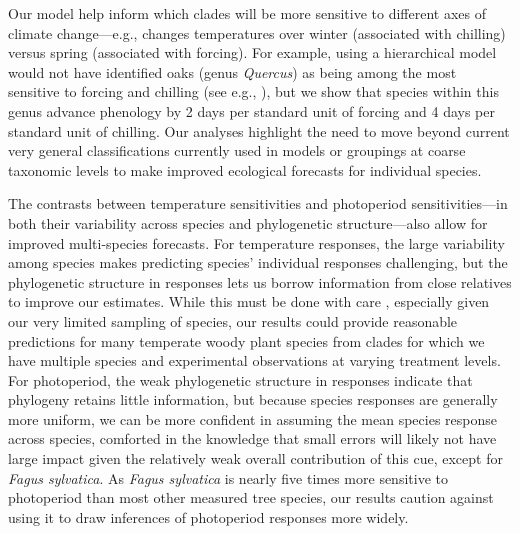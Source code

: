\documentclass{article}\usepackage[]{graphicx}\usepackage[]{color}
\begin{document}
Our model help inform which clades will be more sensitive to different axes of climate change---e.g., changes temperatures over winter (associated with chilling) versus spring (associated with forcing). For example, using a hierarchical model would not have identified oaks (genus \emph{Quercus}) as being among the most sensitive to forcing and chilling (see e.g., \citep{ettinger2020}), but we show that species within this genus advance phenology by 2 days per standard unit of forcing and 4 days per standard unit of chilling. Our analyses highlight the need to move beyond current very general classifications currently used in models \citep[e.g., functional groups ... Cat/Dan, can you offer better ref?][]{Moorcroft:2003dz} or groupings at coarse taxonomic levels \citep[e.g.,][]{ettinger2020} to make improved ecological forecasts for individual species. 

The contrasts between temperature sensitivities and photoperiod sensitivities---in both their variability across species and phylogenetic structure---also allow for improved multi-species forecasts. For temperature responses, the large variability among species makes predicting species' individual responses challenging, but the phylogenetic structure in responses lets us borrow  information from close relatives to improve our estimates. While this must be done with care \citep{molina2018assessing}, especially given our very limited sampling of species, our results could provide reasonable predictions for many temperate woody plant species from clades for which we have multiple species and experimental observations at varying treatment levels. For photoperiod, the weak phylogenetic structure in responses indicate that phylogeny retains little information, but because species responses are generally more uniform, we can be more confident in assuming the mean species response across species, comforted in the knowledge that small errors will likely not have large impact given the relatively weak overall contribution of this cue, except for \emph{Fagus sylvatica}. As \emph{Fagus sylvatica} is nearly five times more sensitive to photoperiod than most other measured tree species, our results caution against using it to draw inferences of photoperiod responses more widely. 
\end{document}
